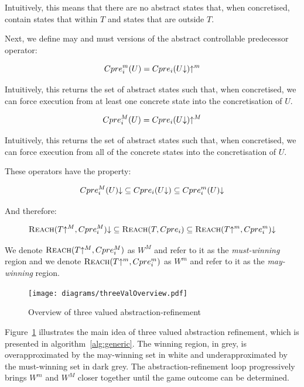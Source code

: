 Intuitively, this means that there are no abstract states that, when concretised, contain states that within $T$ and states that are outside $T$.

Next, we define may and must versions of the abstract controllable predecessor operator:

\begin{equation}
    Cpre_i^m(U) = Cpre_i(U\mathord{\downarrow})\mathord{\uparrow^m}
    \label{eqn:def_cpre_m}
\end{equation}

Intuitively, this returns the set of abstract states such that, when concretised, we can force execution from at least one concrete state into the concretisation of $U$.

\begin{equation}
    Cpre_i^M(U) = Cpre_i(U\mathord{\downarrow})\mathord{\uparrow^M}
    \label{eqn:def_cpre_M}
\end{equation}

Intuitively, this returns the set of abstract states such that, when concretised, we can force execution from all of the concrete states into the concretisation of $U$.

These operators have the property:

\begin{equation}
Cpre_i^M(U)\mathord{\downarrow} \subseteq Cpre_i(U\mathord{\downarrow}) \subseteq Cpre_i^m(U)\mathord{\downarrow}
\end{equation}

And therefore:

\begin{equation}
\label{eqn:cpre_inclusion}
\textsc{Reach}(T\mathord{\uparrow^M}, Cpre_i^M)\mathord{\downarrow} \subseteq \textsc{Reach}(T, Cpre_i) \subseteq \textsc{Reach}(T\mathord{\uparrow^m}, Cpre_i^m)\mathord{\downarrow}
\end{equation}

We denote $\textsc{Reach}(T\mathord{\uparrow^M}, Cpre_i^M)$ as $W^M$ and refer to it as the \emph{must-winning} region and we denote $\textsc{Reach}(T\mathord{\uparrow^m}, Cpre_i^m)$ as $W^m$ and refer to it as the \emph{may-winning} region.

\begin{figure}[t]
\centering
\texttt{[image: diagrams/threeValOverview.pdf]}
\caption{Overview of three valued abstraction-refinement}
\label{fig:three_val_overview}
\end{figure}

Figure~\ref{fig:three_val_overview} illustrates the main idea of three valued abstraction refinement, which is presented in algorithm~\ref{alg:generic}. The winning region, in grey, is overapproximated by the may-winning set in white and underapproximated by the must-winning set in dark grey. The abstraction-refinement loop progressively brings $W^m$ and $W^M$ closer together until the game outcome can be determined.

